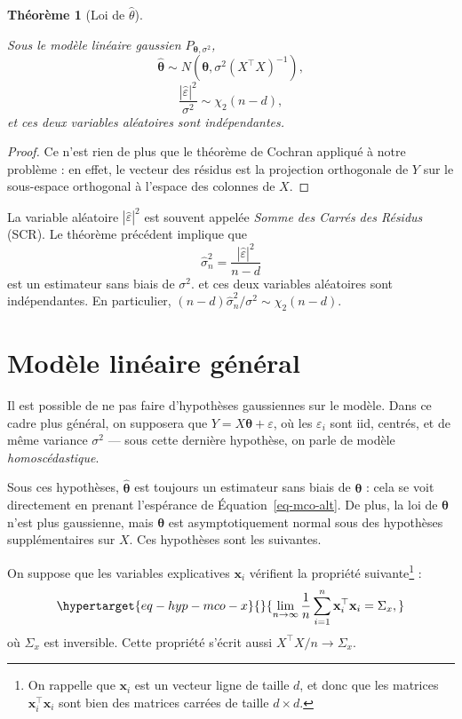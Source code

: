 \documentclass[
  10,
  letterpaper,
  DIV=11,
  numbers=noendperiod]{scrreport}
\newcommand{\bx}{\mathbf{x}}
\newcommand{\bt}{\boldsymbol{\theta}}
\theoremstyle{plain}
\newtheorem{theorem}{Théorème}[chapter]
\theoremstyle{definition}
\theoremstyle{plain}
\theoremstyle{definition}
\theoremstyle{definition}
\theoremstyle{plain}
\theoremstyle{remark}
\begin{document}
\begin{theorem}[Loi de
\(\hat{\theta}\)]\protect\hypertarget{thm-glm}{}\label{thm-glm}

Sous le modèle linéaire gaussien \(P_{\bt, \sigma^2}\),
\[\hat{\bt} \sim N(\bt, \sigma^2 (X^\top X)^{-1}), \]
\[\frac{|\hat{\varepsilon}|^2}{\sigma^2} \sim \chi_2(n-d), \] et ces
deux variables aléatoires sont indépendantes.

\end{theorem}

\begin{proof}

Ce n'est rien de plus que le théorème de Cochran appliqué à notre
problème : en effet, le vecteur des résidus est la projection
orthogonale de \(Y\) sur le sous-espace orthogonal à l'espace des
colonnes de \(X\).

\end{proof}

La variable aléatoire \(|\hat\varepsilon|^2\) est souvent appelée
\emph{Somme des Carrés des Résidus} (SCR). Le théorème précédent
implique que \[\hat{\sigma}^2_n = \frac{|\hat\varepsilon|^2}{n-d}\] est
un estimateur sans biais de \(\sigma^2\). et ces deux variables
aléatoires sont indépendantes. En particulier,
\((n-d)\hat{\sigma}^2_n/\sigma^2 \sim \chi_2(n-d)\).

\hypertarget{sec-mlgen}{%
\section{Modèle linéaire général}\label{sec-mlgen}}

Il est possible de ne pas faire d'hypothèses gaussiennes sur le modèle.
Dans ce cadre plus général, on supposera que \(Y = X\bt + \varepsilon\),
où les \(\varepsilon_i\) sont iid, centrés, et de même variance
\(\sigma^2\) --- sous cette dernière hypothèse, on parle de modèle
\emph{homoscédastique}.

Sous ces hypothèses, \(\hat{\bt}\) est toujours un estimateur sans biais
de \(\bt\) : cela se voit directement en prenant l'espérance de
Équation~\ref{eq-mco-alt}. De plus, la loi de \(\bt\) n'est plus
gaussienne, mais \(\bt\) est asymptotiquement normal sous des hypothèses
supplémentaires sur \(X\). Ces hypothèses sont les suivantes.

On suppose que les variables explicatives \(\bx_i\) vérifient la
propriété suivante\footnote{On rappelle que \(\bx_i\) est un vecteur
  ligne de taille \(d\), et donc que les matrices \(\bx_i^\top \bx_i\)
  sont bien des matrices carrées de taille \(d \times d\).} :~
\begin{equation}\protect\hypertarget{eq-hyp-mco-x}{}{ \lim_{n \to \infty}\frac{1}{n}\sum_{i=1}^n \bx_i^\top \bx_i = \Sigma_x,}\label{eq-hyp-mco-x}\end{equation}
où \(\Sigma_x\) est inversible. Cette propriété s'écrit aussi
\(X^\top X / n \to \Sigma_x\).
\end{document}
